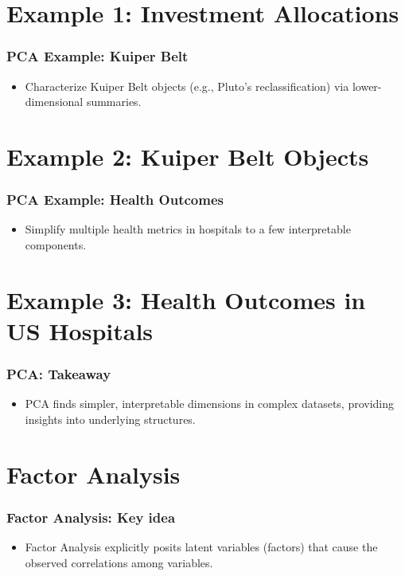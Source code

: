 \documentclass{beamer}
\begin{document}
\section{Example 1: Investment Allocations}

\begin{frame}
    \frametitle{PCA Example: Kuiper Belt}
    \begin{itemize}
        \item Characterize Kuiper Belt objects (e.g., Pluto's reclassification) via lower-dimensional summaries.
    \end{itemize}
\end{frame}

\section{Example 2: Kuiper Belt Objects}

\begin{frame}
    \frametitle{PCA Example: Health Outcomes}
    \begin{itemize}
        \item Simplify multiple health metrics in hospitals to a few interpretable components.
    \end{itemize}
\end{frame}

\section{Example 3: Health Outcomes in US Hospitals}

\begin{frame}
    \frametitle{PCA: Takeaway}
    \begin{itemize}
        \item PCA finds simpler, interpretable dimensions in complex datasets, providing insights into underlying structures.
    \end{itemize}
\end{frame}

\section{Factor Analysis}

\begin{frame}
    \frametitle{Factor Analysis: Key idea}
    \begin{itemize}
        \item Factor Analysis explicitly posits \alert{latent variables} (factors) that cause the observed correlations among variables.
    \end{itemize}
\end{frame}
\end{document}
